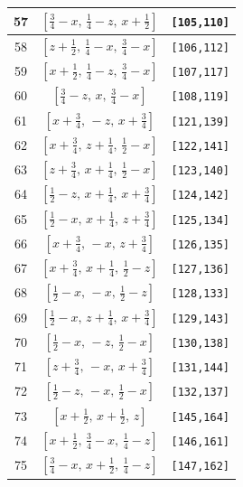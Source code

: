 \documentclass[fleqn,8pt]{jsarticle}
\begin{document}
\begin{longtable}{ccc}
57 & $\left[ \frac{3}{4} - x,\, \frac{1}{4} - z,\, x + \frac{1}{2} \right]$ & {\tt [105,110]} \\ \hline
58 & $\left[ z + \frac{1}{2},\, \frac{1}{4} - x,\, \frac{3}{4} - x \right]$ & {\tt [106,112]} \\ \hline
59 & $\left[ x + \frac{1}{2},\, \frac{1}{4} - z,\, \frac{3}{4} - x \right]$ & {\tt [107,117]} \\ \hline
60 & $\left[ \frac{3}{4} - z,\, x,\, \frac{3}{4} - x \right]$ & {\tt [108,119]} \\ \hline
61 & $\left[ x + \frac{3}{4},\, - z,\, x + \frac{3}{4} \right]$ & {\tt [121,139]} \\ \hline
62 & $\left[ x + \frac{3}{4},\, z + \frac{1}{4},\, \frac{1}{2} - x \right]$ & {\tt [122,141]} \\ \hline
63 & $\left[ z + \frac{3}{4},\, x + \frac{1}{4},\, \frac{1}{2} - x \right]$ & {\tt [123,140]} \\ \hline
64 & $\left[ \frac{1}{2} - z,\, x + \frac{1}{4},\, x + \frac{3}{4} \right]$ & {\tt [124,142]} \\ \hline
65 & $\left[ \frac{1}{2} - x,\, x + \frac{1}{4},\, z + \frac{3}{4} \right]$ & {\tt [125,134]} \\ \hline
66 & $\left[ x + \frac{3}{4},\, - x,\, z + \frac{3}{4} \right]$ & {\tt [126,135]} \\ \hline
67 & $\left[ x + \frac{3}{4},\, x + \frac{1}{4},\, \frac{1}{2} - z \right]$ & {\tt [127,136]} \\ \hline
68 & $\left[ \frac{1}{2} - x,\, - x,\, \frac{1}{2} - z \right]$ & {\tt [128,133]} \\ \hline
69 & $\left[ \frac{1}{2} - x,\, z + \frac{1}{4},\, x + \frac{3}{4} \right]$ & {\tt [129,143]} \\ \hline
70 & $\left[ \frac{1}{2} - x,\, - z,\, \frac{1}{2} - x \right]$ & {\tt [130,138]} \\ \hline
71 & $\left[ z + \frac{3}{4},\, - x,\, x + \frac{3}{4} \right]$ & {\tt [131,144]} \\ \hline
72 & $\left[ \frac{1}{2} - z,\, - x,\, \frac{1}{2} - x \right]$ & {\tt [132,137]} \\ \hline
73 & $\left[ x + \frac{1}{2},\, x + \frac{1}{2},\, z \right]$ & {\tt [145,164]} \\ \hline
74 & $\left[ x + \frac{1}{2},\, \frac{3}{4} - x,\, \frac{1}{4} - z \right]$ & {\tt [146,161]} \\ \hline
75 & $\left[ \frac{3}{4} - x,\, x + \frac{1}{2},\, \frac{1}{4} - z \right]$ & {\tt [147,162]} \\ \hline

\end{longtable}
\end{document}
